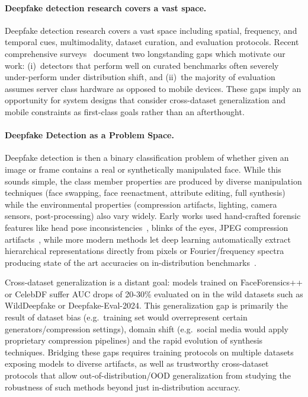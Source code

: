 \paragraph{Deepfake detection research covers a vast space.}
Deepfake detection research covers a vast space including spatial, frequency, and temporal cues, multimodality, dataset curation, and evaluation protocols. Recent comprehensive surveys~\cite{verdoliva2020forensics_survey,pei2024deepfakesurvey} document two longstanding gaps which motivate our work: (i)~detectors that perform well on curated benchmarks often severely under\hyp perform under distribution shift, and (ii)~the majority of evaluation assumes server class hardware as opposed to mobile devices. These gaps imply an opportunity for system designs that consider cross\hyp dataset generalization and mobile constraints as first\hyp class goals rather than an afterthought.

\paragraph{Deepfake Detection as a Problem Space.}
Deepfake detection is then a binary classification problem of whether given an image or frame contains a real or synthetically manipulated face. While this sounds simple, the class member properties are produced by diverse manipulation techniques (face swapping, face reenactment, attribute editing, full synthesis) while the environmental properties (compression artifacts, lighting, camera sensors, post\hyp processing) also vary widely. Early works used hand\hyp crafted forensic features like head pose inconsistencies~\cite{yang2019exposing}, blinks of the eyes, JPEG compression artifacts~\cite{cozzolino2019noiseprint}, while more modern methods let deep learning automatically extract hierarchical representations directly from pixels or Fourier/frequency spectra producing state of the art accuracies on in\hyp distribution benchmarks~\cite{rossler2019faceforensicspp,dolhansky2020dfdc,li2020celebdf}.

Cross\hyp dataset generalization is a distant goal: models trained on FaceForensics++ or CelebDF suffer AUC drops of 20\hyp 30\% evaluated on in the wild datasets such as WildDeepfake or Deepfake\hyp Eval\hyp 2024. This generalization gap is primarily the result of dataset bias (e.g.\ training set would overrepresent certain generators/compression settings), domain shift (e.g.\ social media would apply proprietary compression pipelines) and the rapid evolution of synthesis techniques. Bridging these gaps requires training protocols on multiple datasets exposing models to diverse artifacts, as well as trustworthy cross\hyp dataset protocols that allow out\hyp of\hyp distribution/OOD generalization from studying the robustness of such methods beyond just in\hyp distribution accuracy.


